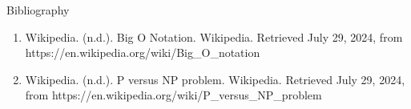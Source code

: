\documentclass[aspectratio=169]{beamer}
\begin{document}
\begin{frame}{Bibliography}
    \begin{enumerate}
        \item Wikipedia. (n.d.). Big O Notation. Wikipedia. Retrieved July 29, 2024, from https://en.wikipedia.org/wiki/Big\_O\_notation
        \item Wikipedia. (n.d.). P versus NP problem. Wikipedia. Retrieved July 29, 2024, from https://en.wikipedia.org/wiki/P\_versus\_NP\_problem
    \end{enumerate}
\end{frame}
\end{document}
